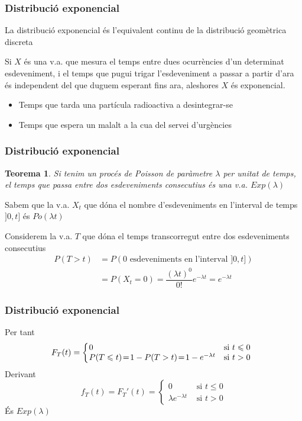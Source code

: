 \documentclass[12pt,t]{beamer}\usepackage[]{graphicx}\usepackage[]{color}
\renewcommand{\leq}{\leqslant}
\theoremstyle{plain}
\newtheorem{teorema}{Teorema}
\theoremstyle{definition}
\begin{document}
\begin{frame} 
\frametitle{Distribució exponencial}

La distribució exponencial és l'equivalent continu de la distribució geomètrica discreta
\medskip

Si $X$ és una v.a. que mesura el temps entre dues ocurrències d'un determinat esdeveniment,
i el temps que pugui trigar l'esdeveniment a passar a partir d'ara és independent del que duguem esperant fins ara, aleshores $X$ és exponencial.
\medskip

\begin{itemize}
\item Temps que tarda una partícula radioactiva a desintegrar-se

\item Temps que espera un malalt a la cua del servei d'urgències
\end{itemize}

\end{frame}

\begin{frame} 
\frametitle{Distribució exponencial}

\begin{teorema}
Si tenim un procés de Poisson de paràmetre $\lambda$ per unitat de temps, el temps que passa entre dos esdeveniments consecutius és una v.a. $Exp(\lambda)$
\end{teorema}

Sabem que la v.a. $X_t$ que dóna el nombre d'esdeveniments en l'interval de temps $]0,t]$ és  $Po(\lambda t)$
\medskip

Considerem la v.a. $T$ que dóna el temps transcorregut entre dos esdeveniments consecutius
$$
\begin{array}{rl}
P(T>t) & = P(\mbox{0 esdeveniments en l'interval }]0,t])\\
 & =P(X_t=0)=\dfrac{(\lambda t)^0}{0!} e^{-\lambda t}=e^{-\lambda t}
\end{array}
$$

\end{frame}

\begin{frame} 
\frametitle{Distribució exponencial}

Per tant
$$
F_T(t) = \left\{
\begin{array}{ll}
\hspace*{-1ex}
0 & \mbox{si $t\leq 0$}\\
\hspace*{-1ex}
P(T\leq t)\!=\!1-P(T>t)\!=\! 1-e^{-\lambda t} & \mbox{si $t> 0$}
\end{array}\right.
$$
Derivant
$$
f_{T}(t)=F_T'(t)=
\left\{\begin{array}{ll}
          0 & \mbox{ si } t\leq 0\\
        \lambda e^{-\lambda t} & \mbox{ si }  t>0
         \end{array}\right.
$$
És $Exp(\lambda)$

\end{frame}
\end{document}
